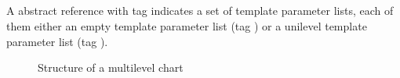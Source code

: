 

\subsection{}
\label{sec:ifc:ChartSort:Multilevel}

A  abstract reference with tag  indicates a set of template 
parameter lists, each of them either an empty template parameter list (tag ) or a unilevel 
template parameter list (tag ).

\begin{figure}[H]
	\centering
	\caption{Structure of a multilevel chart}
	\label{fig:ifc-multilevel-chart-structure}
\end{figure}

